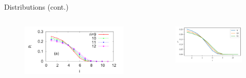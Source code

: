 \documentclass[xcolor={dvipsnames}]{beamer}
\begin{document}
\begin{frame}{Distributions (cont.)}
\begin{columns}[t]
    \begin{figure}
        \includegraphics[scale=0.25]{paper.PNG}
    \end{figure}
    \vspace{-2em}
    \begin{figure}
        \includegraphics[scale=0.5]{mine.PNG}
    \end{figure}


\end{columns}
\end{frame}
\end{document}
